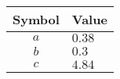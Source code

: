 \begin{tabular}{cl}
\hline
  Symbol  & Value   \\
\hline
   $a$    & $0.38$  \\
   $b$    & $0.3$   \\
   $c$    & $4.84$  \\
\hline
\end{tabular}
